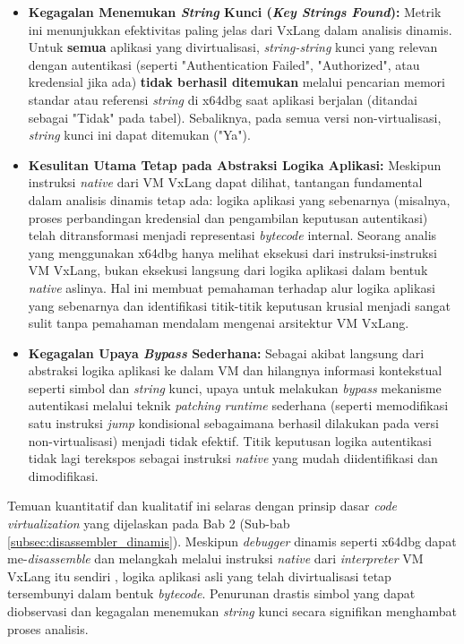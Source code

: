 \begin{itemize}
    \item \textbf{Kegagalan Menemukan \textit{String} Kunci (\textit{Key Strings Found}):}
      Metrik ini menunjukkan efektivitas paling jelas dari VxLang dalam analisis dinamis. Untuk \textbf{semua} aplikasi yang divirtualisasi, \textit{string-string} kunci yang relevan dengan autentikasi (seperti "Authentication Failed", "Authorized", atau kredensial jika ada) \textbf{tidak berhasil ditemukan} melalui pencarian memori standar atau referensi \textit{string} di x64dbg saat aplikasi berjalan (ditandai sebagai "Tidak" pada tabel). Sebaliknya, pada semua versi non-virtualisasi, \textit{string} kunci ini dapat ditemukan ("Ya"). 

    \item \textbf{Kesulitan Utama Tetap pada Abstraksi Logika Aplikasi:}
    Meskipun instruksi \textit{native} dari VM VxLang dapat dilihat, tantangan fundamental dalam analisis dinamis tetap ada: logika aplikasi yang sebenarnya (misalnya, proses perbandingan kredensial dan pengambilan keputusan autentikasi) telah ditransformasi menjadi representasi \textit{bytecode} internal. Seorang analis yang menggunakan x64dbg hanya melihat eksekusi dari instruksi-instruksi VM VxLang, bukan eksekusi langsung dari logika aplikasi dalam bentuk \textit{native} aslinya. Hal ini membuat pemahaman terhadap alur logika aplikasi yang sebenarnya dan identifikasi titik-titik keputusan krusial menjadi sangat sulit tanpa pemahaman mendalam mengenai arsitektur VM VxLang.

    \item \textbf{Kegagalan Upaya \textit{Bypass} Sederhana:}
    Sebagai akibat langsung dari abstraksi logika aplikasi ke dalam VM dan hilangnya informasi kontekstual seperti simbol dan \textit{string} kunci, upaya untuk melakukan \textit{bypass} mekanisme autentikasi melalui teknik \textit{patching runtime} sederhana (seperti memodifikasi satu instruksi \textit{jump} kondisional sebagaimana berhasil dilakukan pada versi non-virtualisasi) menjadi tidak efektif. Titik keputusan logika autentikasi tidak lagi terekspos sebagai instruksi \textit{native} yang mudah diidentifikasi dan dimodifikasi.
\end{itemize}

Temuan kuantitatif dan kualitatif ini selaras dengan prinsip dasar \textit{code virtualization} yang dijelaskan pada Bab 2 (Sub-bab \ref{subsec:disassembler_dinamis}). Meskipun \textit{debugger} dinamis seperti x64dbg dapat me-\textit{disassemble} dan melangkah melalui instruksi \textit{native} dari \textit{interpreter} VM VxLang itu sendiri \cite{Sikorski2012}, logika aplikasi asli yang telah divirtualisasi tetap tersembunyi dalam bentuk \textit{bytecode}. Penurunan drastis simbol yang dapat diobservasi dan kegagalan menemukan \textit{string} kunci secara signifikan menghambat proses analisis.

